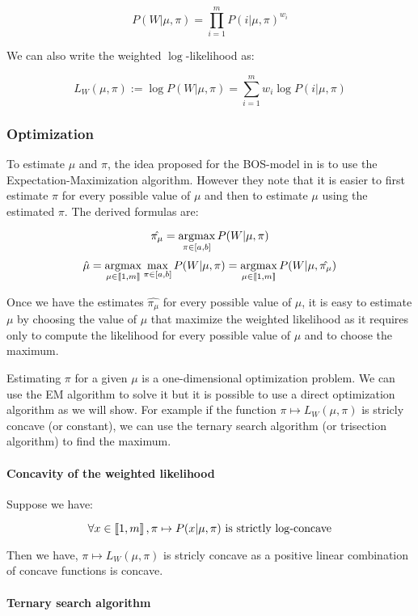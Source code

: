 $$P(W | \mu, \pi) = \prod_{i=1}^m P(i | \mu, \pi)^{w_i}$$

We can also write the weighted $\log$-likelihood as:

$$L_W(\mu, \pi) := \log P(W | \mu, \pi) = \sum_{i=1}^m w_i \log P(i | \mu, \pi)$$


\subsubsection{Optimization}
\label{sec:univariate_generic_estimation}

To estimate $\mu$ and $\pi$, the idea proposed for the BOS-model in \cite{biernacki2016model} is to use the Expectation-Maximization algorithm. However they note that it is easier to first estimate $\pi$ for every possible value of $\mu$ and then to estimate $\mu$ using the estimated $\pi$. The derived formulas are:


$$\hat{\pi_{\mu}} = \operatorname*{argmax}_{\pi \in [a, b]} P(W | \mu, \pi)$$
$$\hat{\mu} = \operatorname*{argmax}_{\mu \in \left\llbracket1, m\right\rrbracket} \max_{\pi \in [a, b]} P(W | \mu, \pi) = \operatorname*{argmax}_{\mu \in \left\llbracket1, m\right\rrbracket} P(W | \mu, \hat{\pi_{\mu}})$$

Once we have the estimates $\hat{\pi_{\mu}}$ for every possible value of $\mu$, it is easy to estimate $\mu$ by choosing the value of $\mu$ that maximize the weighted likelihood as it requires only to compute the likelihood for every possible value of $\mu$ and to choose the maximum.

Estimating $\pi$ for a given $\mu$ is a one-dimensional optimization problem. We can use the EM algorithm to solve it but it is possible to use a direct optimization algorithm as we will show. For example if the function $\pi \mapsto L_W(\mu, \pi)$ is stricly concave (or constant), we can use the ternary search algorithm (or trisection algorithm) to find the maximum.

\paragraph{Concavity of the weighted likelihood}

Suppose we have:

$$\forall x \in \left\llbracket1, m\right\rrbracket, \pi \mapsto P(x | \mu, \pi) \text{ is strictly $\log$-concave}$$

Then we have, $\pi \mapsto L_W(\mu, \pi)$ is stricly concave as a positive linear combination of concave functions is concave.

\paragraph{Ternary search algorithm}



